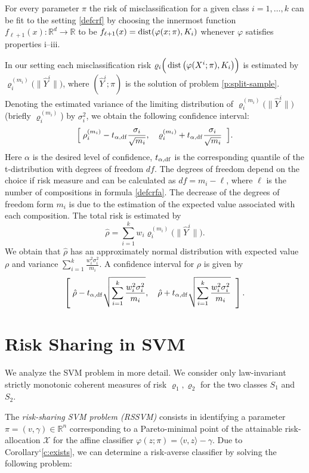 \documentclass[10pt,letterpaper]{article}
\newcommand{\R}{\mathbb{R}}
\newcommand{\Xc}{\mathcal{X}}
\newcommand{\1}{1{\hskip -2.55 pt}\hbox{I}}
\newcommand{\dist}{\mathop{\rm dist}}
\begin{document}
For every parameter $\pi$ the risk of misclassification for a given class $i=1,\dots, k$ can be fit to the setting \eqref{defcrf} by choosing 
the innermost function $f_{\ell+1}(x):\mathbb{R}^{d} \rightarrow \mathbb{R}$ to be  $f_{\ell+1}(x) = \dist(\varphi(x;\pi),{K_i})$ whenever $\varphi$ satisfies properties i--iii.

In our setting each misclassification risk $\varrho_i\Big(\dist\big(\varphi(X^i;\pi),{K_i}\big)\Big)$ is estimated by $\varrho_i^{(m_i)}\big(\|\hat{Y}^i\|\big)$, where $(\hat{Y}^i;\hat{\pi})$ is the solution of problem \eqref{p:split-sample}. 
Denoting the estimated variance of the limiting distribution of $\varrho_i^{(m_i)}\big(\|\hat{Y}^i\|\big)$ (briefly $\varrho_i^{(m_i)}$) by  $\sigma_i^2$, we obtain the following confidence interval:
\[
\Big[ \;\rho_i^{(m_i)} - t_{\alpha,{\rm df}}\frac{\sigma_i}{\sqrt{m_i}},\quad 
\varrho_i^{(m_i)} + t_{\alpha,{\rm df}}\frac{\sigma_i}{\sqrt{m_i}}\;\;
\Big].
\]
Here $\alpha$ is the desired level of confidence, $t_{\alpha,{\rm df}}$ is the corresponding quantile of the t-distribution with degrees of freedom $df$. 
The degrees of freedom depend on the choice if risk measure and can be calculated as 
$df=m_i-\ell$, where $\ell$ is the number of compositions in formula \eqref{defcrfa}. 
The decrease of the degrees of freedom form $m_i$ is due to the estimation of the expected value associated with each composition.
The total risk is estimated by 
\[
 \hat{\rho}= \sum_{i=1}^k w_i\varrho_i^{(m_i)}\big(\|\hat{Y}^i\|\big).
\]
We obtain that $\hat{\rho}$ has an approximately normal distribution with expected value
$\rho$ and variance $\sum_{i=1}^k \frac{w_i^2\sigma_i^2}{m_i}.$ A confidence interval for $\rho$ is given by
\[
\left[\;\hat{\rho}- t_{\alpha,{\rm df}}\sqrt{\sum_{i=1}^k \frac{w_i^2\sigma_i^2}{m_i}},\quad 
\hat{\rho} +  t_{\alpha,{\rm df}} \sqrt{\sum_{i=1}^k \frac{w_i^2\sigma_i^2}{m_i}}\;\;
\right] .
\]




\section{Risk Sharing in SVM} %
\label{sec:risk_sharing_in_svm}

We analyze the SVM problem in more detail.
We consider only law-invariant strictly monotonic coherent measures of risk $\varrho_1, \varrho_2$ for the two classes $S_1$ and $S_2$.

The \emph{risk-sharing SVM problem (RSSVM)} consists in identifying a parameter $\pi=(v,\gamma)\in\R^n$ corresponding to a Pareto-minimal point of the attainable risk-allocation $\Xc$ for the affine classifier $\varphi(z;\pi)=\langle v, z\rangle -\gamma$.
Due to Corollary`\ref{c:exists}, we can determine a risk-averse classifier by solving the following problem:
\end{document}
